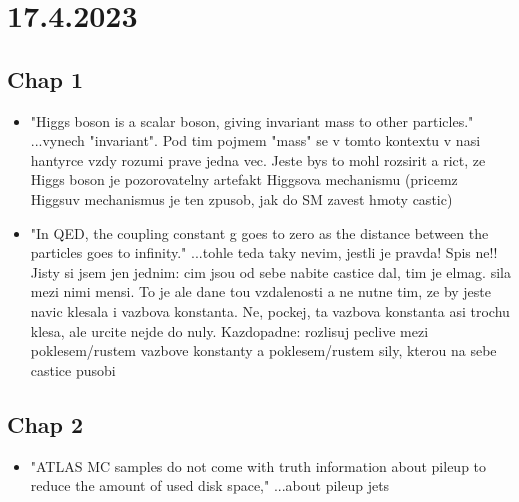 \section{17.4.2023}


\subsection{Chap 1}
\begin{itemize}
    \item "Higgs boson is a scalar boson, giving invariant mass to other particles." ...vynech "invariant". Pod tim pojmem "mass" se v tomto kontextu v nasi hantyrce vzdy rozumi prave jedna vec. Jeste bys to mohl rozsirit a rict, ze Higgs boson je pozorovatelny artefakt Higgsova mechanismu (pricemz Higgsuv mechanismus je ten zpusob, jak do SM zavest hmoty castic)
    \item "In QED, the coupling constant g goes to zero as the
    distance between the particles goes to infinity." ...tohle teda taky nevim, jestli je pravda! Spis ne!! Jisty si jsem jen jednim: cim jsou od sebe nabite castice dal, tim je elmag. sila mezi nimi mensi. To je ale dane tou vzdalenosti a ne nutne tim, ze by jeste navic klesala i vazbova konstanta. Ne, pockej, ta vazbova konstanta asi trochu klesa, ale urcite nejde do nuly. Kazdopadne: rozlisuj peclive mezi poklesem/rustem vazbove konstanty a poklesem/rustem sily, kterou na sebe castice pusobi
\end{itemize}

\subsection{Chap 2}
\begin{itemize}
    \item "ATLAS MC samples do not come with truth information about pileup to reduce
    the amount of used disk space," ...about pileup jets
\end{itemize}